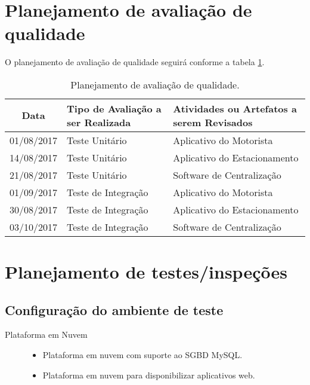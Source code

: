 \section{Planejamento de avaliação de qualidade}

O planejamento de avaliação de qualidade seguirá conforme a tabela \ref{tab:quality-evaluation-plan}.

\begin{table}[h]
	\begin{tabularx}{.9\textwidth}{| c | X | X |}
		\hline
		\textbf{Data} & \textbf{Tipo de Avaliação a ser Realizada} & \textbf{Atividades ou Artefatos a serem Revisados} \\
		\hline
		01/08/2017    & Teste Unitário                              & Aplicativo do Motorista                            \\
		\hline
		14/08/2017    & Teste Unitário                              & Aplicativo do Estacionamento                       \\
		\hline
		21/08/2017    & Teste Unitário                              & Software de Centralização                        \\
		\hline
		01/09/2017    & Teste de Integração                        & Aplicativo do Motorista                            \\
		\hline
		30/08/2017    & Teste de Integração                        & Aplicativo do Estacionamento                       \\
		\hline
		03/10/2017    & Teste de Integração                        & Software de Centralização                        \\
		\hline
	\end{tabularx}
	\centering
	\caption{Planejamento de avaliação de qualidade.}
	\label{tab:quality-evaluation-plan}
\end{table}

\section{Planejamento de testes/inspeções}

\subsection{Configuração do ambiente de teste}

\begin{description}
	\item[Plataforma em Nuvem] \hfill
	\begin{itemize}
		\item Plataforma em nuvem com suporte ao SGBD MySQL.
		\item Plataforma em nuvem para disponibilizar aplicativos web.
	\end{itemize}
\end{description}

